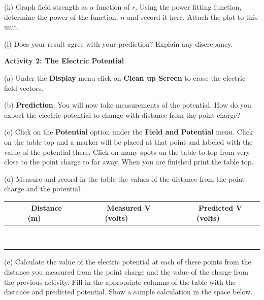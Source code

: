 (k) Graph field strength as a function of $r$. Using the power fitting
function, determine the power of the function, $n$ and record it here.
Attach the plot to this unit.
\vspace{15mm}

(l) Does your result agree with your prediction? Explain any discrepancy.
\vspace{15mm}

\vspace{0.5in}
\textbf{Activity 2: The Electric Potential}

(a) Under the {\bf Display} menu click on {\bf Clean up Screen} to erase the
electric field vectors.

(b) \textbf{Prediction}: You will now take measurements of the potential.
How do you expect the electric potential to change with distance from the point
charge?
\vspace{15mm}
 
(c) Click on the \textbf{Potential} option under the \textbf{Field and Potential}
menu. Click on the table top and a marker will be
placed at that point and labeled with the value of the potential there.
Click on many spots on the table to top from very close to the point charge to
far away.
When you are finished print the table top.
\vspace{15mm}

(d) Measure and record in the table the values of the distance from the
point charge and the potential.

\vspace{0.3cm}
{\centering \begin{tabular}{|c|c|c|}
\hline 
~~~Distance (m)~~~&
~~~Measured V (volts)~~~&
~~~Predicted V (volts)~~~\\
\hline
\hline 
&
&
\\
\hline 
&
&
\\
\hline 
&
&
\\
\hline 
&
&
\\
\hline 
&
&
\\
\hline 
&
&
\\
\hline 
&
&
\\
\hline 
&
&
\\
\hline 
&
&
\\
\hline
\end{tabular}\par}
\vspace{0.3cm}


(e) Calculate the value of the electric potential at each of these points
from the distance you measured from the point charge and the value of the charge from the
previous activity.
Fill in the appropriate columns of the table  with the distance
and predicted potential. Show a sample calculation in the space below.
\vspace{1in}


